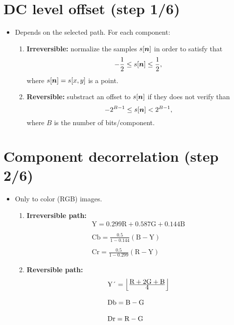 \section{DC level offset (step 1/6)}
\begin{itemize}
\item [] Depends on the selected path. For each component:
\begin{enumerate}
\item \textbf{Irreversible:} normalize the samples
  $s[{\mbox{\boldmath$n$}}]$ in order to satisfy that
  \begin{equation}
    -\frac{1}{2}\le s[{\mbox{\boldmath$n$}}] \le \frac{1}{2},
  \end{equation}
  where $s[{\mbox{\boldmath$n$}}]=s[x,y]$ is a point.
\item \textbf{Reversible:} substract an offset to 
  $s[{\mbox{\boldmath$n$}}]$ if they does not verify than
  \begin{equation}
    -2^{B-1}\le s[{\mbox{\boldmath$n$}}] < 2^{B-1},
  \end{equation}
  where $B$ is the number of bits/component.
\end{enumerate}
\end{itemize}

\section{Component decorrelation (step 2/6)}
\begin{itemize}
\item [] Only to color (RGB) images.
  \begin{enumerate}
  \item \textbf{Irreversible path:}
    \begin{equation}
      \begin{array}{l}
        \text{Y} = 0.299\text{R}+0.587\text{G}+0.144\text{B}\\
        ~\\
        \text{Cb} = \frac{\displaystyle0.5}{\displaystyle1-0.144}(\text{B}-\text{Y})\\
        ~\\
        \text{Cr} = \frac{\displaystyle0.5}{\displaystyle1-0.299}(\text{R}-\text{Y})
      \end{array}
    \end{equation}
  \item \textbf{Reversible path:}
    \begin{equation}
      \begin{array}{l}
        \text{Y\'{}} =
        \Big\lfloor\frac{\displaystyle\text{R}+2\text{G}+\text{B}}{\displaystyle 4}\Big\rfloor\\
         ~\\
       \text{Db} = \text{B}-\text{G}\\
        ~\\
        \text{Dr} = \text{R}-\text{G}
      \end{array}
    \end{equation}
  \end{enumerate}
\end{itemize}




